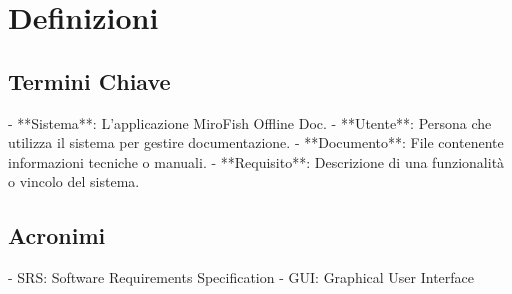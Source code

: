 \section{Definizioni}

\subsection{Termini Chiave}

- **Sistema**: L'applicazione MiroFish Offline Doc.
- **Utente**: Persona che utilizza il sistema per gestire documentazione.
- **Documento**: File contenente informazioni tecniche o manuali.
- **Requisito**: Descrizione di una funzionalità o vincolo del sistema.

\subsection{Acronimi}

- SRS: Software Requirements Specification
- GUI: Graphical User Interface